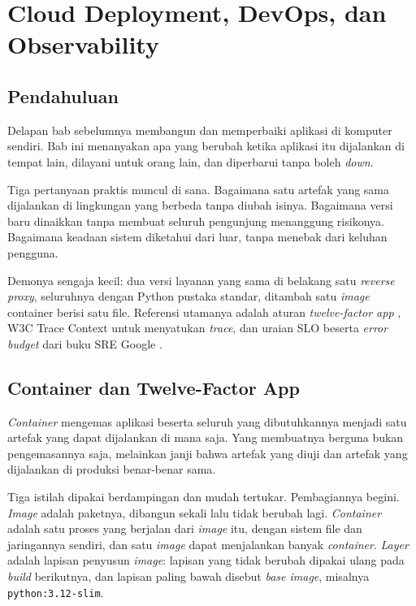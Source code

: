 \chapter{Cloud Deployment, DevOps, dan Observability}
\label{ch:deployment}

\section{Pendahuluan}

Delapan bab sebelumnya membangun dan memperbaiki aplikasi di komputer
sendiri. Bab ini menanyakan apa yang berubah ketika aplikasi itu dijalankan
di tempat lain, dilayani untuk orang lain, dan diperbarui tanpa boleh \textit{down}.

Tiga pertanyaan praktis muncul di sana. Bagaimana satu artefak yang sama
dijalankan di lingkungan yang berbeda tanpa diubah isinya. Bagaimana versi
baru dinaikkan tanpa membuat seluruh pengunjung menanggung risikonya.
Bagaimana keadaan sistem diketahui dari luar, tanpa menebak dari keluhan
pengguna.

Demonya sengaja kecil: dua versi layanan yang sama di belakang satu
\textit{reverse proxy}, seluruhnya dengan Python pustaka standar, ditambah
satu \textit{image} container berisi satu file. Referensi utamanya adalah
aturan \textit{twelve-factor app} \cite{twelve-factor}, W3C Trace Context
\cite{w3c-trace-context} untuk menyatukan \textit{trace}, dan uraian SLO
beserta \textit{error budget} dari buku SRE Google \cite{beyer2016sre}.

\section{Container dan Twelve-Factor App}

\textit{Container} mengemas aplikasi beserta seluruh yang dibutuhkannya
menjadi satu artefak yang dapat dijalankan di mana saja. Yang membuatnya
berguna bukan pengemasannya saja, melainkan janji bahwa artefak yang diuji
dan artefak yang dijalankan di produksi benar-benar sama.

Tiga istilah dipakai berdampingan dan mudah tertukar. Pembagiannya begini.
\textit{Image} adalah paketnya, dibangun sekali lalu tidak berubah lagi.
\textit{Container} adalah satu proses yang berjalan dari \textit{image} itu,
dengan sistem file dan jaringannya sendiri, dan satu \textit{image} dapat
menjalankan banyak \textit{container}. \textit{Layer} adalah lapisan
penyusun \textit{image}: lapisan yang tidak berubah dipakai ulang pada
\textit{build} berikutnya, dan lapisan paling bawah disebut \textit{base
image}, misalnya \texttt{python:3.12-slim}.

